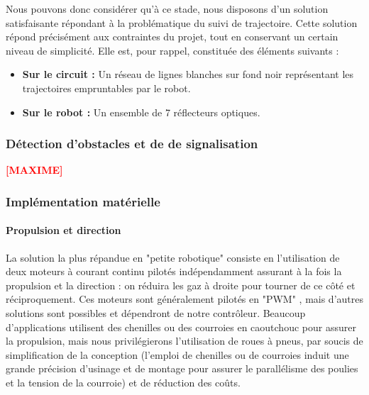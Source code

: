 		Nous pouvons donc considérer qu'à ce stade, nous disposons d'un solution satisfaisante répondant à la problématique du suivi de trajectoire.
		Cette solution répond précisément aux contraintes du projet, tout en conservant un certain niveau de simplicité. Elle est, pour rappel, constituée des éléments suivants :\\

		\begin{itemize}
			\item \textbf{Sur le circuit :} Un réseau de lignes blanches sur fond noir représentant les trajectoires empruntables par le robot.
			\item \textbf{Sur le robot :} Un ensemble de 7 réflecteurs optiques.
		\end{itemize}

	\subsubsection{Détection d'obstacles et de de signalisation}

		\textbf{\Huge{\textcolor{red}{[MAXIME]}}}

	\subsubsection{Implémentation matérielle}

		\paragraph{Propulsion et direction}

			La solution la plus répandue en "petite robotique" consiste en l'utilisation de deux moteurs à courant continu pilotés indépendamment assurant à la fois la propulsion et la direction : on réduira les gaz à droite pour tourner de ce côté et réciproquement. Ces moteurs sont généralement pilotés en "PWM" , mais d'autres solutions sont possibles et dépendront de notre contrôleur. Beaucoup d'applications utilisent des chenilles ou des courroies en caoutchouc pour assurer la propulsion, mais nous privilégierons l’utilisation de roues à pneus, par soucis de simplification de la conception (l'emploi de chenilles ou de courroies induit  une grande précision d'usinage et de montage pour assurer le parallélisme des poulies et la tension de la courroie) et de réduction des coûts.\\


